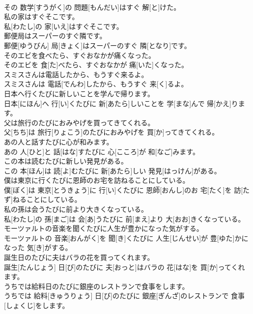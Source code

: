 \documentclass[8pt]{extreport}
\begin{document}
\begin{CJK}{UTF8}{min}
\\	その 数学[すうがく]の 問題[もんだい]はすぐ 解[と]けた。
\\	私の家はすぐそこです。	
\\	私[わたし]の 家[いえ]はすぐそこです。
\\	郵便局はスーパーのすぐ隣です。	
\\	郵便[ゆうびん] 局[きょく]はスーパーのすぐ 隣[となり]です。
\\	そのエビを食べたら、すぐおなかが痛くなった。	
\\	そのエビを 食[た]べたら、すぐおなかが 痛[いた]くなった。
\\	スミスさんは電話したから、もうすぐ来るよ。	
\\	スミスさんは 電話[でんわ]したから、もうすぐ 来[く]るよ。
\\	日本へ行くたびに新しいことを学んで帰ります。	
\\	日本[にほん]へ 行[い]くたびに 新[あたら]しいことを 学[まな]んで 帰[かえ]ります。
\\	父は旅行のたびにおみやげを買ってきてくれる。	
\\	父[ちち]は 旅行[りょこう]のたびにおみやげを 買[か]ってきてくれる。
\\	あの人と話すたびに心が和みます。	
\\	あの 人[ひと]と 話[はな]すたびに 心[こころ]が 和[なご]みます。
\\	この本は読むたびに新しい発見がある。	
\\	この 本[ほん]は 読[よ]むたびに 新[あたら]しい 発見[はっけん]がある。
\\	僕は東京に行くたびに恩師のお宅を訪ねることにしている。	
\\	僕[ぼく]は 東京[とうきょう]に 行[い]くたびに 恩師[おんし]のお 宅[たく]を 訪[たず]ねることにしている。
\\	私の孫は会うたびに前より大きくなっている。	
\\	私[わたし]の 孫[まご]は 会[あ]うたびに 前[まえ]より 大[おお]きくなっている。
\\	モーツァルトの音楽を聞くたびに人生が豊かになった気がする。	
\\	モーツァルトの 音楽[おんがく]を 聞[き]くたびに 人生[じんせい]が 豊[ゆた]かになった 気[き]がする。
\\	誕生日のたびに夫はバラの花を買ってくれます。	
\\	誕生[たんじょう] 日[び]のたびに 夫[おっと]はバラの 花[はな]を 買[か]ってくれます。
\\	うちでは給料日のたびに銀座のレストランで食事をします。	
\\	うちでは 給料[きゅうりょう] 日[び]のたびに 銀座[ぎんざ]のレストランで 食事[しょくじ]をします。

\end{CJK}
\end{document}
